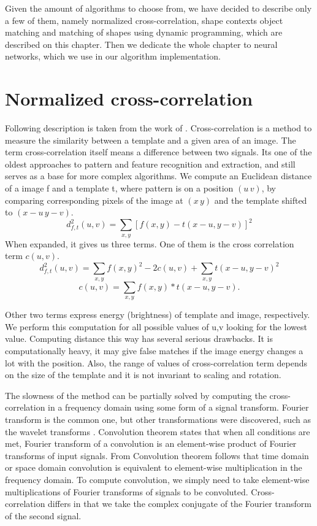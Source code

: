 Given the amount of algorithms to choose from, we have decided to describe only a few of them, namely normalized cross-correlation, shape contexts object matching and matching of shapes using dynamic programming, which are described on this chapter. Then we dedicate the whole chapter to neural networks, which we use in our algorithm implementation.

\section{Normalized cross-correlation}
Following description is taken from the work of \cite{crossCorrLewis}.
Cross-correlation is a method to measure the similarity between a template and a given area of an image. The term cross-correlation itself means a difference between two signals. Its one of the oldest approaches to pattern and feature recognition and extraction, and still serves as a base for more complex algorithms.
We compute an Euclidean distance of a image f and a template t, where pattern is on a position $(u\,v)$, by comparing corresponding pixels of the image at $(x\,y)$ and the template shifted to $(x-u\,y-v)$. 
\begin{equation*}
d_{f,t}^{2}(u,v)=\sum_{x,y} [ f(x,y) - t(x-u, y-v) ]^{2} 
\end{equation*}
When expanded, it gives us three terms. One of them is the cross correlation term $c(u,v)$.
\begin{equation*}
d_{f,t}^{2}(u,v)=\sum_{x,y} f(x,y)^{2} - 2c(u,v) + \sum_{x,y} t(x-u, y-v)^2
\end{equation*}
\begin{equation*}
c(u,v)=\sum_{x,y} f(x,y) * t(x-u, y-v).
\end{equation*}

Other two terms express energy (brightness) of template and image, respectively. We perform this computation for all possible values of u,v looking for the lowest value. Computing distance this way has several serious drawbacks. It is computationally heavy, it may give false matches if the image energy changes a lot with the position. Also, the range of values of cross-correlation term depends on the size of the template and it is not invariant to scaling and rotation. 

The slowness of the method can be partially solved by computing the cross-correlation in a frequency domain using some form of a signal transform. Fourier transform is the common one, but other transformations were discovered, such as the wavelet transforms \cite{patternRecNN}. Convolution theorem states that when all conditions are met, Fourier transform of a convolution is an element-wise product of Fourier transforms of input signals. From Convolution theorem follows that time domain or space domain convolution is equivalent to element-wise multiplication in the frequency domain. To compute convolution, we simply need to take element-wise multiplications of Fourier transforms of signals to be convoluted. Cross-correlation differs in that we take the complex conjugate of the Fourier transform of the second signal.

